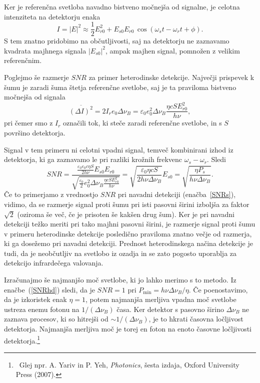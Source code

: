 Ker je referenčna svetloba navadno bistveno močnejša od signalne, je celotna intenziteta
na detektorju enaka
\begin{equation}
I = |E|^2 \approx \frac{1}{2}E_{r0}^2 + E_{s0}E_{r0}\,\cos(\omega_st-\omega_rt+\phi).
\end{equation}
S tem znatno pridobimo na občutljivosti, saj na detektorju ne zaznavamo  
kvadrata majhnega signala $|E_{s0}|^2$, ampak majhen signal, pomnožen z velikim referenčnim. 

Poglejmo še razmerje $SNR$ za primer heterodinske detekcije. Največji prispevek k šumu je 
zaradi šuma štetja referenčne svetlobe, saj je ta praviloma bistveno močnejša od signala
\begin{equation}
\overline{(\Delta I)^2} = 2I_re_0 \Delta\nu_B= \varepsilon_0 
e_0^2\Delta\nu_B\frac{\eta c S E_{r0}^2}{h\nu},
\end{equation}
pri čemer smo z $I_r$ označili tok, ki steče zaradi referenčne svetlobe, in s $S$  
površino detektorja. 

Signal v tem primeru ni celotni vpadni signal, temveč kombinirani izhod iz 
detektorja, ki ga zaznavamo le pri razliki krožnih frekvenc $\omega_s-\omega_r$. Sledi
\begin{equation}
SNR = \frac{\frac{\varepsilon_0 e_0 c \eta S}{2h \nu} E_{s0}E_{r0}}{\sqrt{\frac{\varepsilon_0}{2}
e_0^2 \Delta\nu_B\frac{\eta c S E_{r0}^2}{h\nu}}} = 
\sqrt{\frac{\varepsilon_0\eta c S}{2 h \nu \Delta\nu_B}}E_{s0} = 
\sqrt{\frac{\eta P_s}{h \nu \Delta \nu_B}}.
\label{SNRhd}
\end{equation}
Če to primerjamo z vrednostjo $SNR$ pri navadni detekciji (enačba~\ref{SNRs}), 
vidimo, 
da se razmerje signal proti šumu pri isti pasovni širini izboljša za faktor $\sqrt{2}$
(oziroma še več, če je prisoten še kakšen drug šum).
Ker je pri navadni detekciji težko meriti pri tako majhni pasovni širini, je razmerje
signal proti šumu v primeru heterodinske detekcije posledično praviloma znatno večje
od razmerja, ki ga dosežemo pri navadni detekciji. Prednost heterodinskega 
načina detekcije je tudi, da je neobčutljiv na svetlobo iz ozadja in se 
zato pogosto uporablja za detekcijo infrardečega valovanja.

Izračunajmo še najmanjšo moč svetlobe, ki jo lahko merimo s to metodo. Iz enačbe~(\ref{SNRhd}) 
sledi, da je $SNR=1$ pri $P_{\mathrm{min}} = h\nu \Delta \nu_B/\eta$. Če poenostavimo, da
je izkoristek enak $\eta = 1$, potem najmanjša merljiva vpadna moč svetlobe ustreza
enemu fotonu na $1/(\Delta\nu_B)$ časa. Ker detektor s pasovno širino $\Delta\nu_B$
ne zaznava procesov, ki so hitrejši od $\sim 1/(\Delta\nu_B)$, je to hkrati časovna ločljivost
detektorja. Najmanjša merljiva moč je torej en foton na enoto časovne ločljivosti 
detektorja.\footnote{~Glej npr. A. Yariv in P. Yeh, {\it Photonics}, šesta izdaja, Oxford
University Press (2007).}
